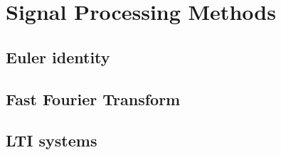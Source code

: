 \chapter{Signal Processing Methods}
\label{append:spm}
\vspace*{2em}

\lipsum[1]

\section{Euler identity}
\label{appsec:euler-identity}

\lipsum[2-3]

\section{Fast Fourier Transform}
\label{appsec:fft}

\lipsum[4-6]

\section{LTI systems}
\label{appsec:lti-systems}

\lipsum[7-8]
